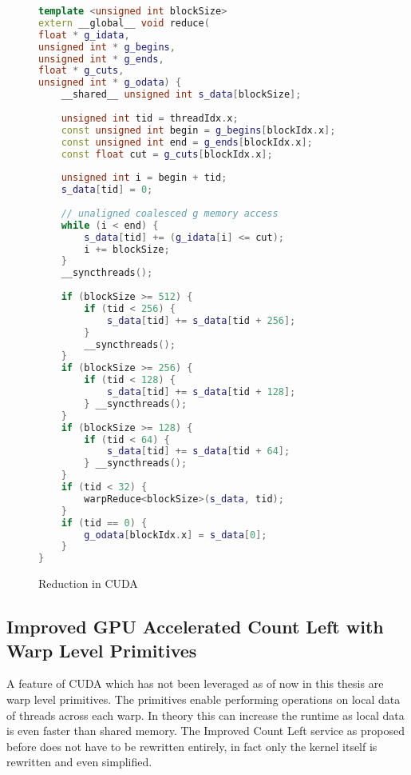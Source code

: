 \documentclass[]{article}
\begin{document}
\begin{figure}[H]
	\begin{lstlisting}[language=c++, caption=Kernel Optimized GPU Count Left, label = ctlocuda]
template <unsigned int blockSize>
extern __global__ void reduce(
float * g_idata,
unsigned int * g_begins,
unsigned int * g_ends,
float * g_cuts,
unsigned int * g_odata) {
	__shared__ unsigned int s_data[blockSize];
	
	unsigned int tid = threadIdx.x;
	const unsigned int begin = g_begins[blockIdx.x];
	const unsigned int end = g_ends[blockIdx.x];
	const float cut = g_cuts[blockIdx.x];
	
	unsigned int i = begin + tid;
	s_data[tid] = 0;
	
	// unaligned coalesced g memory access
	while (i < end) {
		s_data[tid] += (g_idata[i] <= cut);
		i += blockSize;
	}
	__syncthreads();
	
	if (blockSize >= 512) {
		if (tid < 256) {
			s_data[tid] += s_data[tid + 256];
		}
		__syncthreads();
	}
	if (blockSize >= 256) {
		if (tid < 128) {
			s_data[tid] += s_data[tid + 128];
		} __syncthreads();
	}
	if (blockSize >= 128) {
		if (tid < 64) {
			s_data[tid] += s_data[tid + 64];
		} __syncthreads();
	}
	if (tid < 32) {
		warpReduce<blockSize>(s_data, tid);
	}
	if (tid == 0) {
		g_odata[blockIdx.x] = s_data[0];
	}
}
	\end{lstlisting}
	\caption{Reduction in CUDA}
	\label{cuda:reduction2}
\end{figure}


\subsection{Improved GPU Accelerated Count Left with Warp Level Primitives} \label{imprctlwrp}

A feature of CUDA which has not been leveraged as of now in this thesis are warp level primitives. The primitives enable performing operations on local data of threads across each warp. In theory this can increase the runtime as local data is even faster than shared memory. 
The Improved Count Left service as proposed before does not have to be rewritten entirely, in fact only the kernel itself is rewritten and even simplified.
\end{document}
